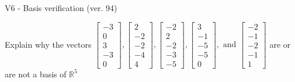 \begin{exercise}
  \begin{exerciseTitle}V6 - Basis verification (ver. 94)\end{exerciseTitle}
  \begin{exerciseStatement}
    Explain why the vectors \(\left[\begin{array}{r}
-3 \\
0 \\
3 \\
-3 \\
0
\end{array}\right] , \left[\begin{array}{r}
2 \\
-2 \\
-2 \\
-4 \\
4
\end{array}\right] , \left[\begin{array}{r}
-2 \\
2 \\
-2 \\
-3 \\
-5
\end{array}\right] , \left[\begin{array}{r}
3 \\
-1 \\
-5 \\
-5 \\
0
\end{array}\right] , \text{ and } \left[\begin{array}{r}
-2 \\
-1 \\
-2 \\
-1 \\
1
\end{array}\right]\) are or are not a basis of \(\mathbb{R}^5\)	



\end{exerciseStatement}
\end{exercise}

